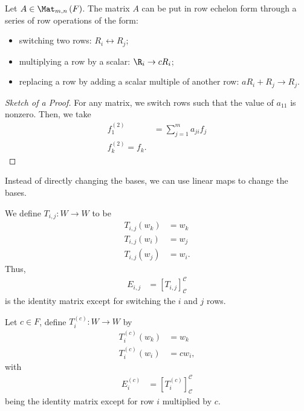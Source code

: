 \documentclass[10pt]{mypackage}
\begin{document}
\begin{theorem}
  Let $A\in \Mat_{m,n}\left(F\right)$. The matrix $A$ can be put in row echelon form through a series of row operations of the form:
  \begin{itemize}
    \item switching two rows: $R_i\leftrightarrow R_j$;
    \item multiplying a row by a scalar: $\R_i\rightarrow cR_i$;
    \item replacing a row by adding a scalar multiple of another row: $aR_i + R_j\rightarrow R_j$.
  \end{itemize}
\end{theorem}
\begin{proof}[Sketch of a Proof]
  For any matrix, we switch rows such that the value of $a_{11}$ is nonzero. Then, we take
  \begin{align*}
    f_{1}^{(2)} &= \sum_{j=1}^{m}a_{ji}f_j\\
    f_k^{(2)} = f_{k}.
  \end{align*}
\end{proof}
Instead of directly changing the bases, we can use linear maps to change the bases.\newline

We define $T_{i,j}: W\rightarrow W$ to be
\begin{align*}
  T_{i,j}\left(w_{k}\right) &= w_k\tag*{$k\neq i,j$}\\
  T_{i,j}\left(w_i\right) &= w_j\\
  T_{i,j}\left(w_j\right) &= w_i.
\end{align*}
Thus,
\begin{align*}
  E_{i,j} &= \left[T_{i,j}\right]_{\mathcal{C}}^{\mathcal{C}}
\end{align*}
is the identity matrix except for switching the $i$ and $j$ rows.\newline

Let $c\in F$, define $T_i^{(c)}:W\rightarrow W$ by
\begin{align*}
  T_i^{(c)}\left(w_k\right) &= w_k\tag*{$k\neq i$}\\
  T_{i}^{(c)}\left(w_i\right) &= cw_i,
\end{align*}
with
\begin{align*}
  E_i^{(c)} &= \left[T_{i}^{(c)}\right]_{\mathcal{C}}^{\mathcal{C}}
\end{align*}
being the identity matrix except for row $i$ multiplied by $c$.\newline
\end{document}
